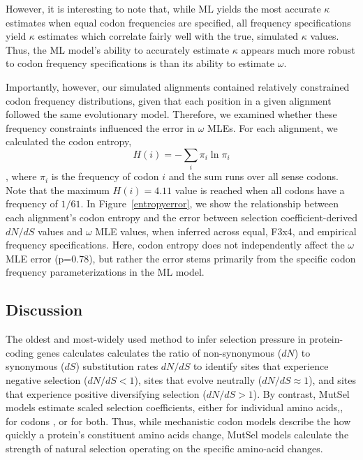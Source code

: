 \documentclass[11pt]{article}
\begin{document}
However, it is interesting to note that, while ML yields the most accurate $\kappa$ estimates when equal codon frequencies are specified, all frequency specifications yield $\kappa$ estimates which correlate fairly well with the true, simulated $\kappa$ values. Thus, the ML model's ability to accurately estimate $\kappa$ appears much more robust to codon frequency specifications is than its ability to estimate $\omega$.

Importantly, however, our simulated alignments contained relatively constrained codon frequency distributions, given that each position in a given alignment followed the same evolutionary model. Therefore, we examined whether these frequency constraints influenced the error in $\omega$ MLEs. For each alignment, we calculated the codon entropy, \begin{equation} H(i) = - \sum_i \pi_i \ln \pi_i \end{equation}, where $\pi_i$ is the frequency of codon $i$ and the sum runs over all sense codons. Note that the maximum $H(i) = 4.11$ value is reached when all codons have a frequency of $1/61$. In Figure~\ref{entropyerror}, we show the relationship between each alignment's codon entropy and the error between selection coefficient-derived $dN/dS$ values and $\omega$ MLE values, when inferred across equal, F3x4, and empirical frequency specifications. Here, codon entropy does not independently affect the $\omega$ MLE error (p=0.78), but rather the error stems primarily from the specific codon frequency parameterizations in the ML model. 



\subsection*{Discussion}
The oldest and most-widely used method to infer selection pressure in protein-coding genes calculates calculates the ratio of non-synonymous ($dN$) to synonymous ($dS$) substitution rates $dN/dS$ to identify sites that experience negative selection ($dN/dS<1$), sites that evolve neutrally ($dN/dS\approx1$), and sites that experience positive diversifying selection ($dN/dS>1$). By contrast, MutSel models estimate scaled selection coefficients, either for individual amino acids,\cite{HalpernBruno1998,NielsenYang2008,Rodrigueetal2010,Tamurietal2012,Tamurietal2014}, for codons \cite{YangNielsen2008}, or for both. Thus, while mechanistic codon models describe the how quickly a protein's constituent amino acids change, MutSel models calculate the strength of natural selection operating on the specific amino-acid changes.  
\end{document}
